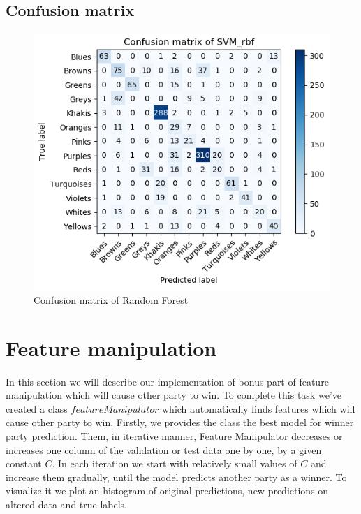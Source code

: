 \documentclass[12pt]{article}
\begin{document}
\newpage
\subsection{Confusion matrix}
\begin{figure}[htp]
\centering
\includegraphics[width=\textwidth]{confusion_matrix/confusion_fig}
\caption{Confusion matrix of Random Forest}
\end{figure}

\newpage
\section{Feature manipulation}
In this section we will describe our implementation of bonus part of feature manipulation which will cause other party to win. To complete this task we've created a class $featureManipulator$ which automatically finds features which will cause other party to win. Firstly, we provides the class the best model for winner party prediction. Them, in iterative manner, Feature Manipulator decreases or increases one column of the validation or test data one by one, by a given constant $C$. In each iteration we start with relatively small values of $C$ and increase them gradually, until the model predicts another party as a winner. To visualize it we plot an histogram of original predictions, new predictions on altered data and true labels.   
\end{document}
